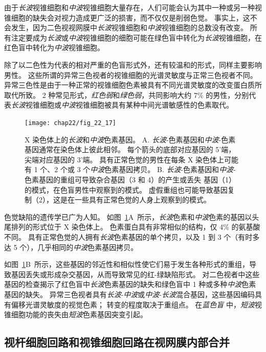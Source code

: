 由于\textit{长波}视锥细胞和\textit{中波}视锥细胞大量存在，人们可能会认为其中一种或另一种视锥细胞的缺失会对视力造成更广泛的损害，而不仅仅是削弱色觉。
事实上，这不会发生，因为二色视视网膜中\textit{长波}视锥细胞和\textit{中波}视锥细胞的总数没有改变。
所有注定要成为\textit{长波}或\textit{中波}视锥细胞的细胞可能在绿色盲中转化为\textit{长波}视锥细胞，在红色盲中转化为\textit{中波}视锥细胞。


除了以二色性为代表的相对严重的色盲形式外，还有较温和的形式，同样主要影响男性。
这些所谓的异常三色视者的视锥细胞的光谱灵敏度与正常三色视者不同。
异常三色性是由于一种正常的视锥细胞色素被具有不同光谱灵敏度的改变蛋白质所取代所致。
2 种常见形式，\textit{红色弱}和\textit{绿色弱}，共同影响大约 7\% 的男性，分别代表\textit{长波}视锥细胞或\textit{中波}视锥细胞被具有某种中间光谱敏感性的色素取代。


\begin{figure}[htbp]
	\centering
	\texttt{[image: chap22/fig\_22\_17]}
	\caption{X 染色体上的\textit{长波}和\textit{中波}色素基因。 
		A. \textit{长波}-色素基因和\textit{中波}-色素基因通常在染色体上彼此相邻。
		每个箭头的底部对应基因的 5'端，尖端对应基因的 3'端。 
		具有正常色觉的男性在每条 X 染色体上可能有 1 个、2 个或 3 个\textit{中波}色素基因拷贝\cite{nathans1986molecular}。
		B. \textit{长波}-色素基因和\textit{中波}-色素基因的重组可导致杂合基因（3 和 4）的产生或丢失 基因（1）的模式，在色盲男性中观察到的模式。 
		虚假重组也可能导致基因复制（2），这是在一些具有正常色觉的人身上观察到的模式。}
	\label{fig:22_17}
\end{figure}


色觉缺陷的遗传学已广为人知。
如图~\ref{fig:22_17}A~所示，\textit{长波}色素和\textit{中波}色素的基因以头尾排列的形式位于 X 染色体上。
色素蛋白具有非常相似的结构，仅 4\% 的氨基酸不同。 
具有正常色觉的人拥有\textit{长波}色素基因的单个拷贝，以及 1 到 3 个（有时多达 5 个），几乎相同的\textit{中波}色素基因拷贝。


如图~\ref{fig:22_17}B~所示，这些基因的邻近性和相似性使它们易于发生各种形式的重组，导致基因丢失或形成杂交基因，从而导致常见的红-绿缺陷形式。
对二色视者中这些基因的检查揭示了红色盲中\textit{长波}色素基因的缺失和绿色盲中 1 种或多种\textit{中波}色素基因的缺失。
异常三色视者具有\textit{长波}-\textit{中波}或\textit{中波}-\textit{长波}混合基因，这些基因编码具有偏移光谱灵敏度的视觉色素；
转变的程度取决于重组点。
在\textit{蓝色盲} 中，\textit{短波}视锥细胞功能的丧失由\textit{短波}色素基因突变引起。



\subsection{视杆细胞回路和视锥细胞回路在视网膜内部合并}


